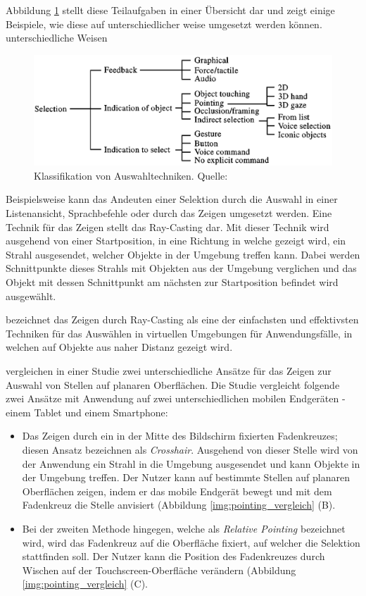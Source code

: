 Abbildung \ref{img:auswahluebersicht} stellt diese Teilaufgaben in einer Übersicht dar und zeigt einige Beispiele, wie diese auf unterschiedlicher weise umgesetzt werden können. 
unterschiedliche Weisen
\begin{figure}[H]
	\centering 
	\includegraphics[width=.8\textwidth]{resources/analyse/Selection_uebersicht.png}
	\caption{Klassifikation von Auswahltechniken. Quelle: \cite[S.~12]{Bowman1999}}
	\label{img:auswahluebersicht}
\end{figure}

Beispielsweise kann das Andeuten einer Selektion durch die Auswahl in einer Listenansicht, Sprachbefehle oder durch das Zeigen umgesetzt werden. 
Eine Technik für das Zeigen stellt das Ray-Casting dar. Mit dieser Technik wird ausgehend von einer Startposition, in eine Richtung in welche gezeigt wird, ein Strahl 
ausgesendet, welcher Objekte in der Umgebung treffen kann. Dabei werden Schnittpunkte dieses Strahls mit Objekten aus der Umgebung verglichen und das Objekt mit dessen Schnittpunkt am nächsten
zur Startposition befindet wird ausgewählt.

\citeauthor{Bowman2011} bezeichnet das Zeigen durch Ray-Casting als eine der einfachsten und effektivsten Techniken für das Auswählen in virtuellen Umgebungen für Anwendungsfälle, in welchen auf Objekte aus 
naher Distanz gezeigt wird.\cite[S.~153]{Bowman2011}

\citeauthor{Vincent2013} vergleichen in einer Studie zwei unterschiedliche Ansätze für das Zeigen zur Auswahl von Stellen auf planaren Oberflächen. 
Die Studie vergleicht folgende zwei Ansätze mit Anwendung auf zwei unterschiedlichen mobilen Endgeräten - einem Tablet und einem Smartphone: 

\begin{itemize}
\item{Das Zeigen durch ein in der Mitte des Bildschirm fixierten Fadenkreuzes; diesen Ansatz bezeichnen \citeauthor{Vincent2013} als \textit{Crosshair}. Ausgehend von dieser Stelle wird von der Anwendung ein 
Strahl in die Umgebung ausgesendet und kann Objekte in der Umgebung treffen. Der Nutzer kann auf bestimmte Stellen auf planaren Oberflächen zeigen, indem er das mobile Endgerät bewegt und mit dem Fadenkreuz die Stelle anvisiert (Abbildung \ref{img:pointing_vergleich} (B).} 
\item{Bei der zweiten Methode hingegen, welche als \textit{Relative Pointing} bezeichnet wird, wird das Fadenkreuz auf die Oberfläche fixiert, auf welcher die Selektion stattfinden soll. Der Nutzer kann die Position des Fadenkreuzes durch Wischen auf der 
	Touchscreen-Oberfläche verändern (Abbildung \ref{img:pointing_vergleich} (C).}
\end{itemize}

